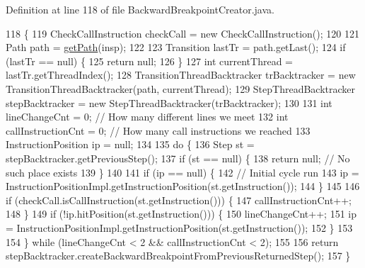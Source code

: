 Definition at line 118 of file Backward\+Breakpoint\+Creator.\+java.


\begin{DoxyCode}
118                                                                                   \{
119     CheckCallInstruction checkCall = \textcolor{keyword}{new} CheckCallInstruction();
120 
121     Path path = \hyperlink{classgov_1_1nasa_1_1jpf_1_1inspector_1_1server_1_1pathanalysis_1_1_backward_breakpoint_creator_a8e3d15618550a3067d26457ca3a5fa49}{getPath}(insp);
122 
123     Transition lastTr = path.getLast();
124     \textcolor{keywordflow}{if} (lastTr == null) \{
125       \textcolor{keywordflow}{return} null;
126     \}
127     \textcolor{keywordtype}{int} currentThread = lastTr.getThreadIndex();
128     TransitionThreadBacktracker trBacktracker = \textcolor{keyword}{new} TransitionThreadBacktracker(path, currentThread);
129     StepThreadBacktracker stepBacktracker = \textcolor{keyword}{new} StepThreadBacktracker(trBacktracker);
130 
131     \textcolor{keywordtype}{int} lineChangeCnt = 0; \textcolor{comment}{// How many different lines we meet}
132     \textcolor{keywordtype}{int} callInstructionCnt = 0; \textcolor{comment}{// How many call instructions we reached}
133     InstructionPosition ip = null;
134 
135     \textcolor{keywordflow}{do} \{
136       Step st = stepBacktracker.getPreviousStep();
137       \textcolor{keywordflow}{if} (st == null) \{
138         \textcolor{keywordflow}{return} null; \textcolor{comment}{// No such place exists}
139       \}
140 
141       \textcolor{keywordflow}{if} (ip == null) \{
142         \textcolor{comment}{// Initial cycle run}
143         ip = InstructionPositionImpl.getInstructionPosition(st.getInstruction());
144       \}
145 
146       \textcolor{keywordflow}{if} (checkCall.isCallInstruction(st.getInstruction())) \{
147         callInstructionCnt++;
148       \}
149       \textcolor{keywordflow}{if} (!ip.hitPosition(st.getInstruction())) \{
150         lineChangeCnt++;
151         ip = InstructionPositionImpl.getInstructionPosition(st.getInstruction());
152       \}
153 
154     \} \textcolor{keywordflow}{while} (lineChangeCnt < 2 && callInstructionCnt < 2);
155 
156     \textcolor{keywordflow}{return} stepBacktracker.createBackwardBreakpointFromPreviousReturnedStep();
157   \}
\end{DoxyCode}
